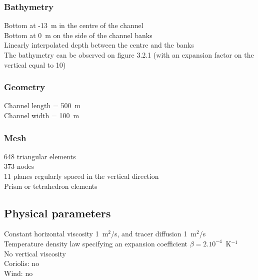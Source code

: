 \subsubsection{Bathymetry}
%
Bottom at -13~m in the centre of the channel\\
Bottom at 0~m on the side of the channel banks\\
Linearly interpolated depth between the centre and the banks\\
The bathymetry can be observed on figure 3.2.1
(with an expansion factor on the vertical equal to 10)
%
\subsubsection{Geometry}
%
Channel length = 500~m\\
Channel width = 100~m
%
\subsubsection{Mesh}
%
648 triangular elements\\
373 nodes\\
11 planes regularly spaced in the vertical direction\\
Prism or tetrahedron elements
%
%
%
\subsection{Physical parameters}
%
Constant horizontal viscosity 1~m$^2$/s, and tracer diffusion 1~m$^2$/s\\
Temperature density law specifying an expansion coefficient
$\beta = 2.10^{-4}$~K$^{-1}$\\
No vertical viscosity\\
Coriolis: no\\
Wind: no
%
%
%
%
%
%

